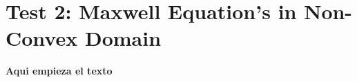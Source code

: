 \documentclass[../Dissertation]{subfiles}
\begin{document}
\section{Test 2: Maxwell Equation's in Non-Convex Domain}\label{sec5:singularMaxwell}
  \textbf{Aqui empieza el texto} 
  \lipsum[1]

\end{document}
